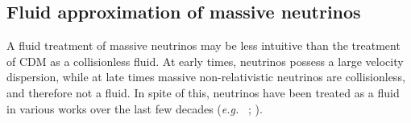 \documentclass{aastex}
\newcommand{\eg}{\textit{e.g.}~}
\begin{document}


\subsection{ Fluid approximation of massive neutrinos }
\label{sec:NuFluid}

A fluid treatment of massive neutrinos may be less intuitive than the
treatment of CDM as a collisionless fluid.  At early
times, neutrinos possess a large velocity dispersion, while at
late times massive non-relativistic neutrinos are collisionless, and
therefore not a fluid.  
In spite of this, neutrinos have been treated
as a fluid in various works over the last few decades (\eg
\cite{Bond83}; \cite{Holtzman89}).  
\end{document}
